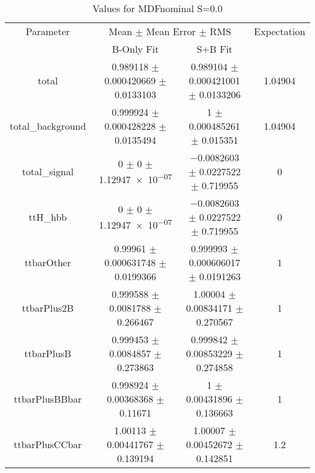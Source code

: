\begin{table}
\centering
\caption{Values for MDFnominal S=0.0}
\begin{tabular}{cccc}
\toprule
Parameter & \multicolumn{2}{c}{Mean $\pm$ Mean Error $\pm$ RMS} & Expectation\\
 & B-Only Fit & S+B Fit & \\
\midrule
total & \num{0.989118} $\pm$ \num{0.000420669} $\pm$ \num{0.0133103} & \num{0.989104} $\pm$ \num{0.000421001} $\pm$ \num{0.0133206} & \num{1.04904}\\
total\_background & \num{0.999924} $\pm$ \num{0.000428228} $\pm$ \num{0.0135494} & \num{1} $\pm$ \num{0.000485261} $\pm$ \num{0.015351} & \num{1.04904}\\
total\_signal & \num{0} $\pm$ \num{0} $\pm$ \num{1.12947e-07} & \num{-0.0082603} $\pm$ \num{0.0227522} $\pm$ \num{0.719955} & \num{0}\\
ttH\_hbb & \num{0} $\pm$ \num{0} $\pm$ \num{1.12947e-07} & \num{-0.0082603} $\pm$ \num{0.0227522} $\pm$ \num{0.719955} & \num{0}\\
ttbarOther & \num{0.99961} $\pm$ \num{0.000631748} $\pm$ \num{0.0199366} & \num{0.999993} $\pm$ \num{0.000606017} $\pm$ \num{0.0191263} & \num{1}\\
ttbarPlus2B & \num{0.999588} $\pm$ \num{0.0081788} $\pm$ \num{0.266467} & \num{1.00004} $\pm$ \num{0.00834171} $\pm$ \num{0.270567} & \num{1}\\
ttbarPlusB & \num{0.999453} $\pm$ \num{0.0084857} $\pm$ \num{0.273863} & \num{0.999842} $\pm$ \num{0.00853229} $\pm$ \num{0.274858} & \num{1}\\
ttbarPlusBBbar & \num{0.998924} $\pm$ \num{0.00368368} $\pm$ \num{0.11671} & \num{1} $\pm$ \num{0.00431896} $\pm$ \num{0.136663} & \num{1}\\
ttbarPlusCCbar & \num{1.00113} $\pm$ \num{0.00441767} $\pm$ \num{0.139194} & \num{1.00007} $\pm$ \num{0.00452672} $\pm$ \num{0.142851} & \num{1.2}\\
\bottomrule
\end{tabular}
\end{table}